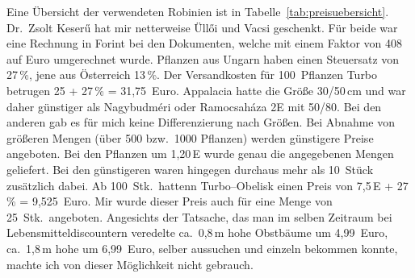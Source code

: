 \documentclass[twocolumn]{scrartcl}
\begin{document}
Eine Übersicht der verwendeten Robinien ist in
Tabelle~\ref{tab:preisuebersicht}. Dr.~Zsolt Keserű hat mir netterweise Üllői und Vacsi geschenkt. Für beide war eine Rechnung in Forint
bei den Dokumenten, welche mit einem Faktor von 408 auf Euro
umgerechnet wurde. Pflanzen aus Ungarn haben einen Steuersatz von
27\,\%, jene aus Österreich 13\,\%. Der Versandkosten für 100~Pflanzen Turbo betrugen 25 +
27\,\% = 31,75~Euro. Appalacia hatte die Größe 30/50\,cm und
war daher günstiger als Nagybudméri oder Ramocsaháza 2E mit 50/80. Bei
den anderen gab es für mich keine Differenzierung nach Größen. Bei
Abnahme von größeren Mengen (über 500 bzw.\ 1000 Pflanzen) werden
günstigere Preise angeboten.
Bei den Pflanzen um 1,20\,E wurde genau die angegebenen Mengen geliefert.
Bei den günstigeren waren hingegen durchaus mehr als 10~Stück zusätzlich dabei.
Ab 100~Stk.\ hattenn Turbo--Obelisk einen Preis von 7,5\,E +
27\,\% = 9,525~Euro. Mir wurde dieser Preis auch für eine
Menge von 25~Stk.\ angeboten. Angesichts der Tatsache, das man im
selben Zeitraum bei Lebensmitteldiscountern veredelte ca.\ 0,8\,m hohe
Obstbäume um 4,99~Euro, ca.\ 1,8\,m hohe um 6,99~Euro, selber
aussuchen und einzeln bekommen konnte, machte ich von dieser
Möglichkeit nicht gebrauch.

\begin{table}[htbp]
  \centering
  \caption{Übersicht über die verwendeten Robinien}
  \label{tab:preisuebersicht}
\end{table}
\end{document}
